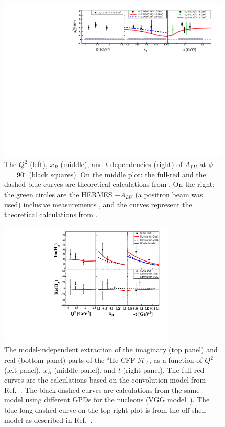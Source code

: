 \documentclass[twocolumn,nofootinbib,showpacs,prl,superscriptaddress,secnumarabic,amssymb,nobibnotes,aps,floatfix]{revtex4}
\begin{document}
\begin{figure}[tb]
\includegraphics[width=16cm]{figs/F_Coherent_ALU_phi_90.pdf}
\caption{The $Q^{2}$ (left), $x_{B}$ (middle), and $t$-dependencies (right) of
   $A_{LU}$ at $\phi$~=~90$^{\circ}$ (black squares). On the 
   middle plot: the full-red and the dashed-blue curves are theoretical 
   calculations from \cite{simonetta_2}. On the right: the green circles are 
   the HERMES $-A_{LU}$ (a positron beam was used) inclusive measurements 
   \cite{Airapetian}, and the curves represent the theoretical calculations 
   from \cite{simonetta_2}.}
\label{fig:alu90}
\end{figure}


\begin{figure}[tb]
\includegraphics[width=8.5cm]{figs/F_Coherent_CFF.pdf}
\caption{The model-independent extraction of the imaginary (top panel) and
real (bottom panel) parts of the $^4$He CFF $\mathcal{H}_A$, as a function of
$Q^{2}$ (left panel), $x_B$ (middle panel), and $t$ (right panel). The full red 
curves are the calculations based on the convolution model from Ref.~\cite{Vadim_priv}.
The black-dashed curves are calculations from the same 
model using different GPDs for the nucleons (VGG model~\cite{Guidal_priv}). The 
blue long-dashed curve on the top-right plot is from
the off-shell model as described in Ref.~\cite{GonzalezHernandez:2012jv}.}
\label{fig:CFF_HA}
\end{figure}
\end{document}
